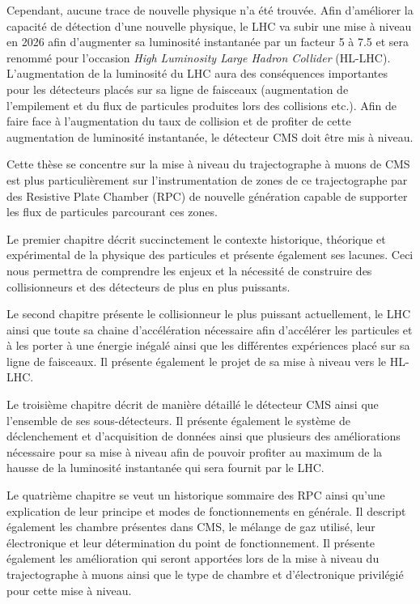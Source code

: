 Cependant, aucune trace de nouvelle physique n'a été trouvée. Afin d'améliorer la capacité de détection d'une nouvelle physique, le LHC va subir une mise à niveau en \num{2026} afin d'augmenter sa luminosité instantanée par un facteur \num{5} à \num{7.5} et sera renommé pour l'occasion \textit{High Luminosity Large Hadron Collider} (HL-LHC). L'augmentation de la luminosité du LHC aura des conséquences importantes pour les détecteurs placés sur sa ligne de faisceaux (augmentation de l'empilement et du flux de particules produites lors des collisions etc.). Afin de faire face à l'augmentation du taux de collision et de profiter de cette augmentation de luminosité instantanée, le détecteur CMS doit être mis à niveau. 

Cette thèse se concentre sur la mise à niveau du trajectographe à muons de CMS est plus particulièrement sur l'instrumentation de zones de ce trajectographe par des Resistive Plate Chamber (RPC) de nouvelle génération capable de supporter les flux de particules parcourant ces zones. 

Le premier chapitre décrit succinctement le contexte historique, théorique et expérimental de la physique des particules et présente également ses lacunes. Ceci nous permettra de comprendre les enjeux et la nécessité de construire des collisionneurs et des détecteurs de plus en plus puissants.

Le second chapitre présente le collisionneur le plus puissant actuellement, le LHC ainsi que toute sa chaine d'accélération nécessaire afin d'accélérer les particules et à les porter à une énergie inégalé ainsi que les différentes expériences placé sur sa ligne de faisceaux. Il présente également le projet de sa mise à niveau vers le HL-LHC.

Le troisième chapitre décrit de manière détaillé le détecteur CMS ainsi que l'ensemble de ses sous-détecteurs. Il présente également le système de déclenchement et d'acquisition de données ainsi que plusieurs des améliorations nécessaire pour sa mise à niveau afin de pouvoir profiter au maximum de la hausse de la luminosité instantanée qui sera fournit par le LHC.

Le quatrième chapitre se veut un historique sommaire des RPC ainsi qu'une explication de leur principe et modes de fonctionnements en générale. Il descript également les chambre présentes dans CMS, le mélange de gaz utilisé, leur électronique et leur détermination du point de fonctionnement. Il présente également les amélioration qui seront apportées lors de la mise à niveau du trajectographe à muons ainsi que le type de chambre et d'électronique privilégié pour cette mise à niveau.

